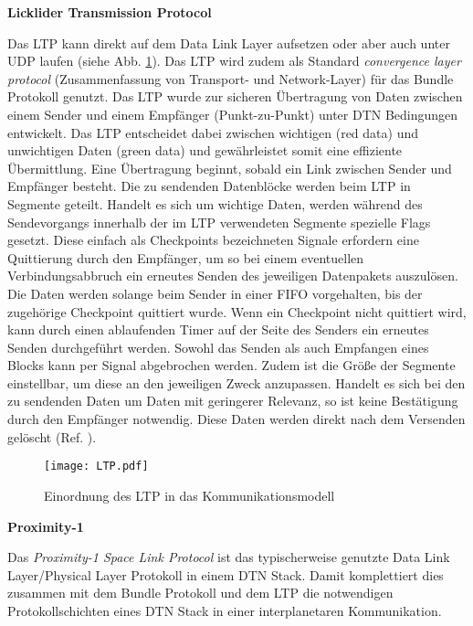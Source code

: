 \textbf{Licklider Transmission Protocol}

Das \gls{LTP} kann direkt auf dem Data Link Layer
aufsetzen oder aber auch unter \gls{UDP} laufen (siehe Abb. \ref{fig:LTP}). Das \gls{LTP}
wird zudem als Standard \textit{convergence layer protocol} (Zusammenfassung von
Transport- und Network-Layer) f{\"u}r das Bundle Protokoll genutzt. Das \gls{LTP}
wurde zur sicheren {\"U}bertragung von Daten zwischen einem Sender und einem
Empf{\"a}nger (Punkt-zu-Punkt) unter \gls{DTN} Bedingungen entwickelt. Das \gls{LTP}
entscheidet dabei zwischen wichtigen (red data) und unwichtigen Daten (green
data) und gew{\"a}hrleistet somit eine effiziente {\"U}bermittlung. Eine
{\"U}bertragung beginnt, sobald ein Link zwischen Sender und Empf{\"a}nger
besteht. Die zu sendenden Datenbl{\"o}cke werden beim \gls{LTP} in Segmente geteilt.
Handelt es sich um wichtige Daten, werden w{\"a}hrend des Sendevorgangs
innerhalb der im \gls{LTP} verwendeten Segmente spezielle Flags gesetzt.
Diese einfach als Checkpoints bezeichneten Signale erfordern eine Quittierung
durch den Empf{\"a}nger, um so bei einem eventuellen Verbindungsabbruch ein
erneutes Senden des jeweiligen Datenpakets auszul{\"o}sen. Die Daten werden
solange beim Sender in einer \gls{FIFO} vorgehalten, bis der zugeh{\"o}rige
Checkpoint quittiert wurde. Wenn ein Checkpoint nicht quittiert wird, kann durch
einen ablaufenden Timer auf der Seite des Senders ein erneutes Senden
durchgeführt werden. Sowohl das Senden als auch Empfangen eines Blocks kann per
Signal abgebrochen werden. Zudem ist die Gr{\"o}{\ss}e der Segmente einstellbar,
um diese an den jeweiligen Zweck anzupassen. Handelt es sich bei den zu sendenden
Daten um Daten mit geringerer Relevanz, so ist keine Best{\"a}tigung durch den
Empf{\"a}nger notwendig.
Diese Daten werden direkt nach dem Versenden gel{\"o}scht (Ref. \cite{web4}).

\begin{figure}[H]
\centering
\texttt{[image: LTP.pdf]}
\caption{Einordnung des LTP in das Kommunikationsmodell}
\label{fig:LTP}
\end{figure}

\textbf{Proximity-1}

Das \textit{Proximity-1 Space Link Protocol} ist das typischerweise genutzte
Data Link Layer/Physical Layer Protokoll in einem \gls{DTN} Stack. Damit komplettiert
dies zusammen mit dem Bundle Protokoll und dem \gls{LTP} die notwendigen
Protokollschichten eines \gls{DTN} Stack in einer interplanetaren Kommunikation.


